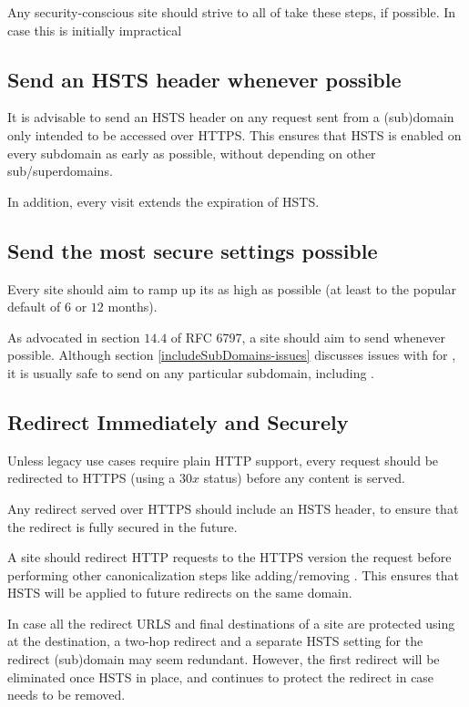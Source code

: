 \documentclass{acm_proc_article-sp}
\begin{document}
Any security-conscious site should strive to all of take these steps, if possible. In case this is initially impractical

\subsection{Send an HSTS header whenever possible}

It is advisable to send an HSTS header on any request sent from a (sub)domain only intended to be accessed over HTTPS. This ensures that HSTS is enabled on every subdomain as early as possible, without depending on other sub/superdomains.

In addition, every visit extends the expiration of HSTS.

\subsection{Send the most secure settings possible}

Every site should aim to ramp up its  as high as possible (at least to the popular default of $6$ or $12$ months).

As advocated in section $14.4$ of RFC 6797\cite{rfc}, a site should aim to send  whenever possible. Although section \ref{includeSubDomains-issues} discusses issues with {\iSD} for {\s}, it is usually safe to send {\iSD} on any particular subdomain, including {\sw}.

\subsection{Redirect Immediately and Securely}

Unless legacy use cases require plain HTTP support, every request should be redirected to HTTPS (using a $30x$ status) before any content is served.

Any redirect served over HTTPS should include an HSTS header, to ensure that the redirect is fully secured in the future.

A site should redirect HTTP requests to the HTTPS version the request before performing other canonicalization steps like adding/removing . This ensures that HSTS will be applied to future redirects on the same domain.

In case all the redirect URLS and final destinations of a site are protected using {\iSD} at the destination, a two-hop redirect and a separate HSTS setting for the redirect (sub)domain may seem redundant. However, the first redirect will be eliminated once HSTS in place, and continues to protect the redirect in case {\iSD} needs to be removed.
\end{document}
